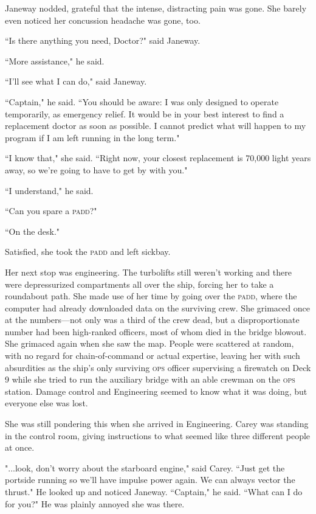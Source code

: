 \documentclass[twoside,letterpaper,12pt]{memoir}
\begin{document}
Janeway nodded, grateful that the intense, distracting pain was gone. She barely even noticed her concussion headache was gone, too.

``Is there anything you need, Doctor?" said Janeway.

``More assistance," he said.

``I'll see what I can do," said Janeway.

``Captain," he said. ``You should be aware: I was only designed to operate temporarily, as emergency relief. It would be in your best interest to find a replacement doctor as soon as possible. I cannot predict what will happen to my program if I am left running in the long term."

``I know that," she said. ``Right now, your closest replacement is 70,000 light years away, so we're going to have to get by with you."

``I understand," he said.

``Can you spare a \textsc{padd}?"

``On the desk."

Satisfied, she took the \textsc{padd} and left sickbay.

Her next stop was engineering. The turbolifts still weren't working and there were depressurized compartments all over the ship, forcing her to take a roundabout path. She made use of her time by going over the \textsc{padd}, where the computer had already downloaded data on the surviving crew. She grimaced once at the numbers---not only was a third of the crew dead, but a disproportionate number had been high-ranked officers, most of whom died in the bridge blowout. She grimaced again when she saw the map. People were scattered at random, with no regard for chain-of-command or actual expertise, leaving her with such absurdities as the ship's only surviving \textsc{ops} officer supervising a firewatch on Deck 9 while she tried to run the auxiliary bridge with an able crewman on the \textsc{ops} station. Damage control and Engineering seemed to know what it was doing, but everyone else was lost.

She was still pondering this when she arrived in Engineering. Carey was standing in the control room, giving instructions to what seemed like three different people at once.

"...look, don't worry about the starboard engine," said Carey. ``Just get the portside running so we'll have impulse power again. We can always vector the thrust." He looked up and noticed Janeway. ``Captain," he said. ``What can I do for you?" He was plainly annoyed she was there.
\end{document}
